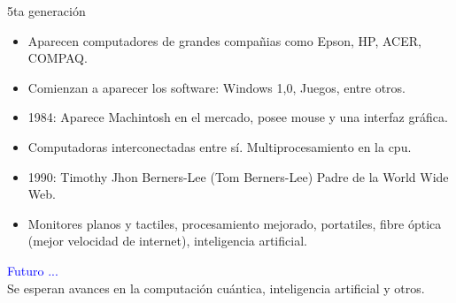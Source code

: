 \documentclass[10pt,xcolor={dvipsnames}]{beamer}
\begin{document}
\begin{frame}{5ta generación}
\begin{itemize}
\item<1- |alert@1> Aparecen computadores de grandes compañias como Epson, HP, ACER, COMPAQ.
\item<2- |alert@2> Comienzan a aparecer los software: Windows 1,0, Juegos, entre otros.
\item<3- |alert@3> 1984: Aparece Machintosh en el mercado, posee mouse y una interfaz gráfica. 
\item<4- |alert@4> Computadoras interconectadas entre sí. Multiprocesamiento en la cpu.
\item<5- |alert@5> 1990: Timothy Jhon Berners-Lee (Tom Berners-Lee) Padre de la World Wide Web. 
\item<6- |alert@6> Monitores planos y tactiles, procesamiento mejorado, portatiles, fibre óptica (mejor velocidad de internet), inteligencia artificial.
\end{itemize}
\begin{center}


\end{center}
\end{frame}

\begin{frame}
\Huge{\textcolor{blue}{Futuro ...}} \\ \pause
\Large{Se esperan avances en la computación cuántica, inteligencia artificial y otros.}
\end{frame}
\end{document}

